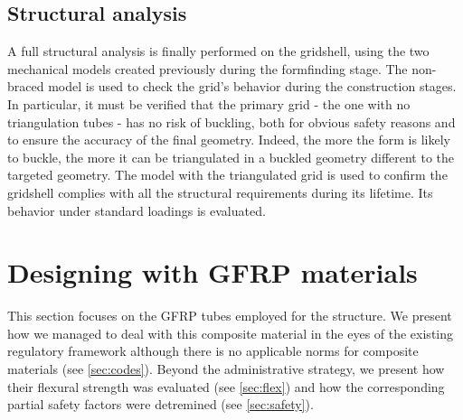 \subsection{Structural analysis}
A full structural analysis is finally performed on the gridshell, using the two mechanical models created previously during the formfinding stage.
The non-braced model is used to check the grid’s behavior during the construction stages. In particular, it must be verified that the primary grid - the one with no triangulation tubes - has no risk of buckling, both for obvious safety reasons and to ensure the accuracy of the final geometry. Indeed, the more the form is likely to buckle, the more it can be triangulated in a buckled geometry different to the targeted geometry. The model with the triangulated grid is used to confirm the gridshell complies with all the structural requirements during its lifetime. Its behavior under standard loadings is evaluated.

\clearpage
\section{Designing with GFRP materials}
This section focuses on the GFRP tubes employed for the structure. We present how we managed to deal with this composite material in the eyes of the existing regulatory framework although there is no applicable norms for composite materials (see \cref{sec:codes}). Beyond the administrative strategy, we present how their flexural strength was evaluated (see \cref{sec:flex}) and how the corresponding partial safety factors were detremined (see \cref{sec:safety}).

